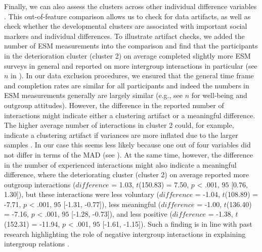 Finally, we can also assess the clusters across other individual
difference variables \citep[e.g.,][]{monden2022}. This out-of-feature
comparison allows us to check for data artifacts, as well as check
whether the developmental clusters are associated with important social
markers and individual differences. To illustrate artifact checks, we
added the number of ESM measurements into the comparison and find that
the participants in the deterioration cluster (cluster 2) on average
completed slightly more ESM surveys in general and reported on more
intergroup interactions in particular (see \(n\) in
). In our data exclusion procedures, we
ensured that the general time frame and completion rates are similar for
all participants and indeed the numbers in ESM measurements generally
are largely similar (e.g., see \(n\) for well-being and outgroup
attitudes). However, the difference in the reported number of
interactions might indicate either a clustering artifact or a meaningful
difference. The higher average number of interactions in cluster 2
could, for example, indicate a clustering artifact if variances are more
inflated due to the larger samples \citep{kogan2006}. In our case this
seems less likely because one out of four variables did not differ in
terms of the MAD (see ). At the same
time, however, the difference in the number of experienced interactions
might also indicate a meaningful difference, where the deteriorating
cluster (cluster 2) on average reported more outgroup interactions
(\(difference\) = 1.03, \(t\)(150.83) = 7.50, \(p\) \textless{} .001,
\(95%
\) {[}0.76, 1.30{]}), but these interactions were less voluntary
(\(difference\) = -1.04, \(t\)(108.89) = -7.71, \(p\) \textless{} .001,
\(95%
\) {[}-1.31, -0.77{]}), less meaningful (\(difference\) = -1.00,
\(t\)(136.40) = -7.16, \(p\) \textless{} .001, \(95%
\) {[}-1.28, -0.73{]}), and less positive (\(difference\) = -1.38,
\(t\)(152.31) = -11.94, \(p\) \textless{} .001, \(95%
\) {[}-1.61, -1.15{]}). Such a finding is in line with past research
highlighting the role of negative intergroup interactions in explaining
intergroup relations \citep[e.g.,][]{Barlow2012, Prati2021, Graf2014}.


